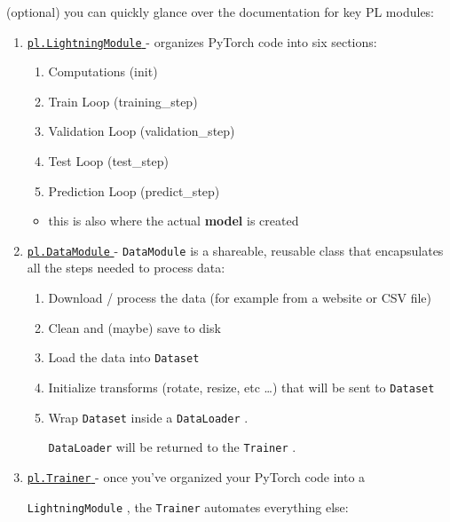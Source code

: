 \documentclass[]{article}
\providecommand{\tightlist}{%
  \setlength{\itemsep}{0pt}\setlength{\parskip}{0pt}}
\let\oldtexttt\texttt
\renewcommand{\texttt}[1]{
  \textcolor{tcolor}{\colorbox{bgcolor}{\oldtexttt{#1}}}
}
\begin{document}
(optional) you can quickly glance over the documentation for key PL
modules:

\begin{enumerate}
\def\labelenumi{\arabic{enumi}.}
\tightlist
\item
  \href{https://pytorch-lightning.readthedocs.io/en/stable/common/lightning_module.html}{\texttt{pl.LightningModule}}
  - organizes PyTorch code into six sections:

  \begin{enumerate}
  \def\labelenumii{\arabic{enumii}.}
  \tightlist
  \item
    Computations (init)
  \item
    Train Loop (training\_step)
  \item
    Validation Loop (validation\_step)
  \item
    Test Loop (test\_step)
  \item
    Prediction Loop (predict\_step)
  \end{enumerate}

  \begin{itemize}
  \tightlist
  \item
    this is also where the actual \textbf{model} is created
  \end{itemize}
\item
  \href{https://pytorch-lightning.readthedocs.io/en/latest/data/datamodule.html}{\texttt{pl.DataModule}}
  - \texttt{DataModule} is a shareable, reusable class that encapsulates
  all the steps needed to process data:

  \begin{enumerate}
  \def\labelenumii{\arabic{enumii}.}
  \tightlist
  \item
    Download / process the data (for example from a website or CSV file)
  \item
    Clean and (maybe) save to disk
  \item
    Load the data into \texttt{Dataset}
  \item
    Initialize transforms (rotate, resize, etc \ldots{}) that will be
    sent to \texttt{Dataset}
  \item
    Wrap \texttt{Dataset} inside a \texttt{DataLoader}.
    \texttt{DataLoader} will be returned to the \texttt{Trainer}.
  \end{enumerate}
\item
  \href{https://pytorch-lightning.readthedocs.io/en/latest/common/trainer.html}{\texttt{pl.Trainer}}
  - once you've organized your PyTorch code into a
  \texttt{LightningModule}, the \texttt{Trainer} automates everything
  else:


\end{enumerate}
\end{document}
